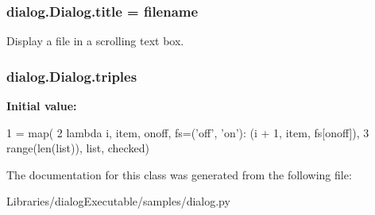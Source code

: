 \subsubsection[{\texorpdfstring{title}{title}}]{\setlength{\rightskip}{0pt plus 5cm}dialog.\+Dialog.\+title = filename\hspace{0.3cm}{\ttfamily [static]}}\hypertarget{classdialog_1_1_dialog_a0ba5ed1f2029a13c537ea89ace62176a}{}\label{classdialog_1_1_dialog_a0ba5ed1f2029a13c537ea89ace62176a}
\begin{DoxyVerb}Display a file in a scrolling text box.\end{DoxyVerb}
\subsubsection[{\texorpdfstring{triples}{triples}}]{\setlength{\rightskip}{0pt plus 5cm}dialog.\+Dialog.\+triples\hspace{0.3cm}{\ttfamily [static]}}\hypertarget{classdialog_1_1_dialog_af2a55a07e5666b5ced1664c301fb4142}{}\label{classdialog_1_1_dialog_af2a55a07e5666b5ced1664c301fb4142}
{\bfseries Initial value\+:}
\begin{DoxyCode}
1 = map(
2         \textcolor{keyword}{lambda} i, item, onoff, fs=(\textcolor{stringliteral}{'off'}, \textcolor{stringliteral}{'on'}): (i + 1, item, fs[onoff]),
3         range(len(list)), list, checked)
\end{DoxyCode}


The documentation for this class was generated from the following file\+:\begin{DoxyCompactItemize}
\item 
Libraries/dialog\+Executable/samples/dialog.\+py\end{DoxyCompactItemize}
